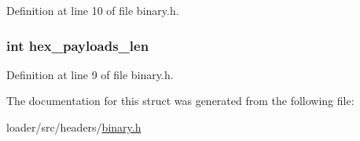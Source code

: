 Definition at line 10 of file binary.\+h.

\subsubsection[{\texorpdfstring{hex\+\_\+payloads\+\_\+len}{hex_payloads_len}}]{\setlength{\rightskip}{0pt plus 5cm}int hex\+\_\+payloads\+\_\+len}\hypertarget{structbinary_afc8f291557c42095685d2a9af0a3416a}{}\label{structbinary_afc8f291557c42095685d2a9af0a3416a}


Definition at line 9 of file binary.\+h.



The documentation for this struct was generated from the following file\+:\begin{DoxyCompactItemize}
\item 
loader/src/headers/\hyperlink{binary_8h}{binary.\+h}\end{DoxyCompactItemize}
